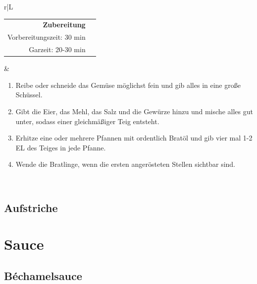 \documentclass[a4paper, 12pt]{scrbook} 								%
\numberwithin{equation}{section} 									%
\begin{document}
	\begin{tabularx}{\textwidth}{r|L}
		\begin{tabular}[t]{rr}
			\textbf{Zubereitung}	\\
			Vorbereitungszeit: 30 min	\\
			Garzeit: 20-30 min		\\
		\end{tabular}			&	\begin{enumerate}[nosep]
										\item Reibe oder schneide das Gemüse möglichst fein und gib alles in eine große Schüssel.
										\item Gibt die Eier, das Mehl, das Salz und die Gewürze hinzu und mische alles gut unter, sodass einer gleichmäßiger Teig entsteht.
										\item Erhitze eine oder mehrere Pfannen mit ordentlich Bratöl und gib vier mal 1-2 EL des Teiges in jede Pfanne.
										\item Wende die Bratlinge, wenn die ersten angerösteten Stellen sichtbar sind.
									\end{enumerate}	\\
	\end{tabularx}
	\newpage

	\section{Aufstriche}


\chapter{Sauce}


	\section{Béchamelsauce}
\end{document}

